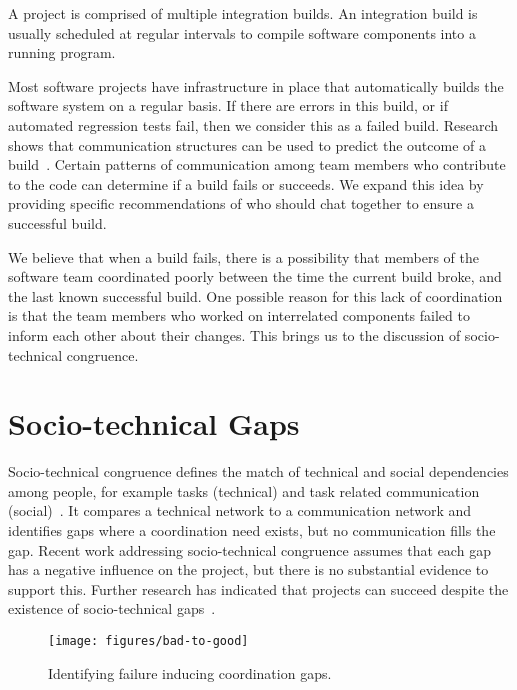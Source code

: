 A project is comprised of multiple integration builds. An 
integration build is usually scheduled at regular intervals to 
compile software components into a running program. 

Most software projects have infrastructure in place that automatically builds the software system on a regular basis. If there are errors in this build, or if automated regression tests fail, then we consider this as a failed build.  Research shows that communication structures can be used 
to predict the outcome of a build~\cite{wolf:tr2008}.  Certain patterns of 
communication among team members who contribute to the 
code can determine if a build fails or succeeds. We expand this idea by providing specific recommendations of 
who should chat together to ensure a successful build.

We believe that when a build fails, there is a possibility that members of the software team coordinated poorly between the time the current build broke, and the last known successful build. One possible reason for this lack of coordination is that the team members who worked on interrelated components failed to inform each other about their changes. This brings us to the discussion of socio-technical congruence.


\section{Socio-technical Gaps}


Socio-technical congruence defines the match of technical 
and social dependencies among people, for example tasks 
(technical) and task related communication (social)~\cite{cataldo2006:coordination_reqs}. It 
compares a technical network to a communication network 
and identifies gaps where a coordination need exists, but no 
communication fills the gap. Recent work addressing socio-technical congruence assumes that each gap has a negative 
influence on the project, but there is no substantial evidence 
to support this. Further research has indicated that projects 
can succeed despite the existence of socio-technical gaps~\cite{sabrian:re08}.

\begin{figure}[t]
\centering
\texttt{[image: figures/bad-to-good]}
\caption{Identifying failure inducing coordination gaps.}
\label{fig:multipleplanes}
\end{figure}

